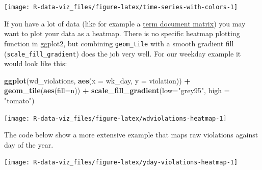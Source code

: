 \documentclass[]{book}
\newenvironment{Shaded}{\begin{snugshade}}{\end{snugshade}}
\newcommand{\KeywordTok}[1]{\textcolor[rgb]{0.13,0.29,0.53}{\textbf{#1}}}
\newcommand{\DataTypeTok}[1]{\textcolor[rgb]{0.13,0.29,0.53}{#1}}
\newcommand{\StringTok}[1]{\textcolor[rgb]{0.31,0.60,0.02}{#1}}
\newcommand{\CommentTok}[1]{\textcolor[rgb]{0.56,0.35,0.01}{\textit{#1}}}
\newcommand{\OperatorTok}[1]{\textcolor[rgb]{0.81,0.36,0.00}{\textbf{#1}}}
\newcommand{\NormalTok}[1]{#1}
\theoremstyle{definition}
\theoremstyle{definition}
\theoremstyle{definition}
\theoremstyle{remark}
\begin{document}
\texttt{[image: R-data-viz\_files/figure-latex/time-series-with-colors-1]}

If you have a lot of data (like for example a
\href{https://en.wikipedia.org/wiki/Document-term_matrix}{term document
matrix}) you may want to plot your data as a heatmap. There is no
specific heatmap plotting function in ggplot2, but combining
\texttt{geom\_tile} with a smooth gradient fill
(\texttt{scale\_fill\_gradient}) does the job very well. For our weekday
example it would look like this:

\begin{Shaded}
\begin{Highlighting}[]
\KeywordTok{ggplot}\NormalTok{(wd_violations, }\KeywordTok{aes}\NormalTok{(}\DataTypeTok{x =}\NormalTok{ wk_day, }\DataTypeTok{y =}\NormalTok{ violation)) }\OperatorTok{+}
\StringTok{     }\KeywordTok{geom_tile}\NormalTok{(}\KeywordTok{aes}\NormalTok{(}\DataTypeTok{fill=}\NormalTok{n)) }\OperatorTok{+}
\StringTok{     }\KeywordTok{scale_fill_gradient}\NormalTok{(}\DataTypeTok{low=}\StringTok{"grey95"}\NormalTok{, }\DataTypeTok{high =} \StringTok{"tomato"}\NormalTok{)}
\end{Highlighting}
\end{Shaded}

\texttt{[image: R-data-viz\_files/figure-latex/wdviolations-heatmap-1]}

The code below show a more extensive example that maps raw violations
against day of the year.

\begin{Shaded}
\end{Shaded}

\texttt{[image: R-data-viz\_files/figure-latex/yday-violations-heatmap-1]}
\end{document}
